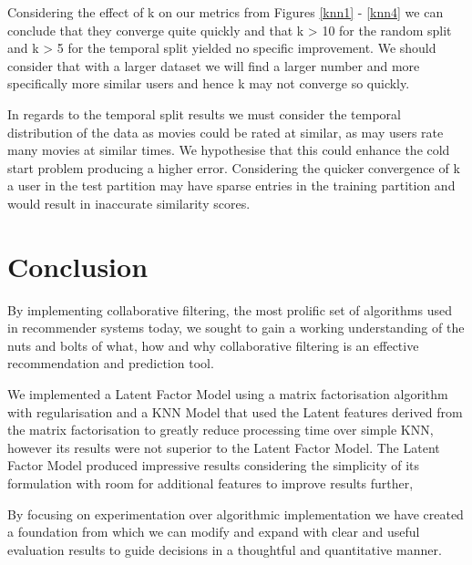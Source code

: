 \documentclass[12pt]{article}
\begin{document}
Considering the effect of k on our metrics from Figures \ref{knn1} - \ref{knn4} we can conclude that they converge quite quickly and that k > 10 for the random split and k > 5 for the temporal split yielded no specific improvement. We should consider that with a larger dataset we will find a larger number and more specifically more similar users and hence k may not converge so quickly. 

In regards to the temporal split results we must consider the temporal distribution of the data as movies could be rated at similar, as may users rate many movies at similar times. We hypothesise that this could enhance the cold start problem producing a higher error. Considering the quicker convergence of k a user in the test partition may have sparse entries in the training partition and would result in inaccurate similarity scores.    

\section{Conclusion}
By implementing collaborative filtering, the most prolific set of algorithms used in recommender systems today, we sought to gain a working understanding of the nuts and bolts of what, how and why collaborative filtering is an effective recommendation and prediction tool. 

We implemented a Latent Factor Model using a matrix factorisation algorithm with regularisation and a KNN Model that used the Latent features derived from the matrix factorisation to greatly reduce processing time over simple KNN, however its results were not superior to the Latent Factor Model. The Latent Factor Model produced impressive results considering the simplicity of its formulation with room for additional features to improve results further,

By focusing on experimentation over algorithmic implementation we have created a foundation from which we can modify and expand with clear and useful evaluation results to guide decisions in a thoughtful and quantitative manner.


%



\end{document}
